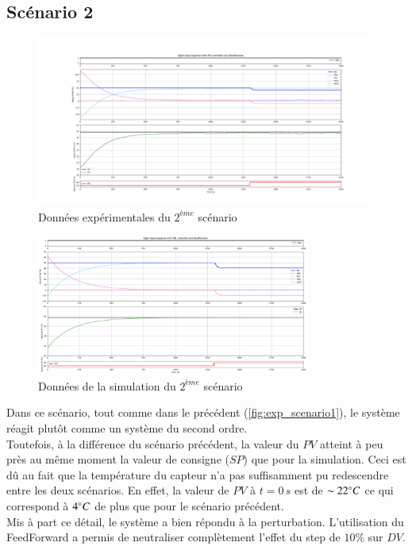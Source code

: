 \subsection{Scénario 2}

\begin{figure}[H]
	\centering
	\includegraphics[width=1\textwidth]{../Plots/Experiment_scenario_3_2024-03-30-19h18.png}
	\caption{Données expérimentales du $2^{ème}$ scénario}
	\label{fig:exp_scenario2}
\end{figure}
\begin{figure}[H]
	\centering
	\includegraphics[width=0.8\textwidth]{figures/scenario3.png}
	\caption{Données de la simulation du $2^{ème}$ scénario}
	\label{fig:sim_scenario2}
\end{figure}

Dans ce scénario, tout comme dans le précédent (\ref{fig:exp_scenario1}), le système réagit plutôt comme un système du second ordre.
\\Toutefois, à la différence du scénario précédent, la valeur du $PV$ atteint à peu près au même moment la valeur de consigne ($SP$) que pour la simulation. Ceci est dû au fait
que la température du capteur n'a pas suffisamment pu redescendre entre les deux scénarios. En effet, la valeur de $PV$ à $t = 0\,s$ est de $\sim 22\degree C$ ce qui correspond 
à $4\degree C$ de plus que pour le scénario précédent. 
\\Mis à part ce détail, le système a bien répondu à la perturbation. L'utilisation du FeedForward a permis de neutraliser complètement l'effet du step de $10\%$ sur $DV$.

